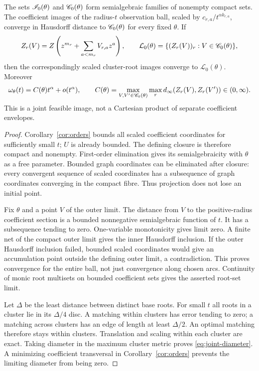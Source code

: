 \begin{theorem}\label{thm:joint}
The sets $\mathscr I_0(\theta)$ and $\mathscr C_0(\theta)$ form semialgebraic families
of nonempty compact sets. The coefficient images of the radius-$t$
observation ball, scaled by $c_{r,a}/t^{\alpha k_{r,a}}$, converge in
Hausdorff distance to $\mathscr C_0(\theta)$ for every fixed $\theta$.
If
\[
 Z_r(V)=Z\left(z^{m_r}+\sum_{a<m_r}V_{r,a}z^a\right),\qquad
 \mathcal L_0(\theta)=\{(Z_r(V))_r:V\in\mathscr C_0(\theta)\},
\]
then the correspondingly scaled cluster-root images converge to
$\mathcal L_0(\theta)$. Moreover
\begin{equation}\label{eq:joint-diameter}
 \omega_\theta(t)=C(\theta)t^\alpha+o(t^\alpha),\qquad
 C(\theta)=\max_{V,V'\in\mathscr C_0(\theta)}\max_r
                 d_\infty(Z_r(V),Z_r(V'))\in(0,\infty).
\end{equation}
This is a joint feasible image, not a Cartesian product of separate
coefficient envelopes.
\end{theorem}
\begin{proof}
Corollary~\ref{cor:orders} bounds all scaled coefficient coordinates
for sufficiently small $t$; $U$ is already bounded. The defining closure
is therefore compact and nonempty. First-order elimination gives its
semialgebraicity with $\theta$ as a free parameter. Bounded graph
coordinates can be eliminated after closure: every convergent sequence
of scaled coordinates has a subsequence of graph coordinates converging
in the compact fibre. Thus projection does not lose an initial point.

Fix $\theta$ and a point $V$ of the outer limit. The distance from $V$
to the positive-radius coefficient section is a bounded nonnegative
semialgebraic function of $t$. It has a subsequence tending to zero.
One-variable monotonicity gives limit zero. A finite net of the compact
outer limit gives the inner Hausdorff inclusion. If the outer Hausdorff
inclusion failed, bounded scaled coordinates would give an accumulation
point outside the defining outer limit, a contradiction. This proves
convergence for the entire ball, not just convergence along chosen arcs.
Continuity of monic root multisets on bounded coefficient sets gives
the asserted root-set limit.

Let $\Delta$ be the least distance between distinct base roots. For
small $t$ all roots in a cluster lie in its $\Delta/4$ disc. A matching
within clusters has error tending to zero; a matching across clusters
has an edge of length at least $\Delta/2$. An optimal matching therefore
stays within clusters. Translation and scaling within each cluster are
exact. Taking diameter in the maximum cluster metric proves
\eqref{eq:joint-diameter}. A minimizing coefficient transversal in
Corollary~\ref{cor:orders} prevents the limiting diameter from being zero.
\end{proof}

